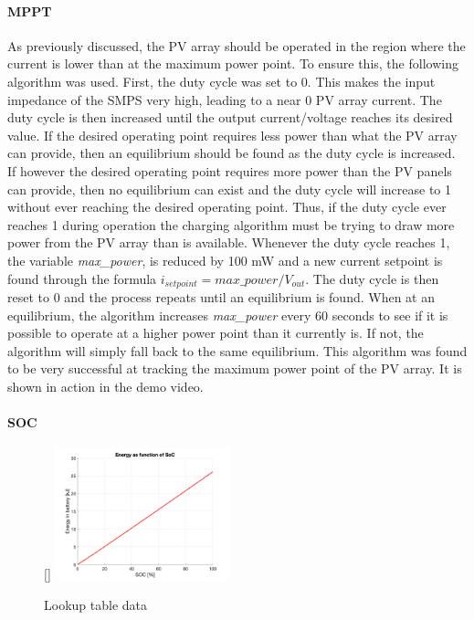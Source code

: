 \documentclass[a4paper]{article}
\begin{document}
\paragraph*{MPPT}
\vspace{-6pt}
As previously discussed, the PV array should be operated in the region 
where the current is lower than at the maximum power point. To ensure 
this, the following algorithm was used. First, the duty cycle was set 
to 0. This makes the input impedance of the SMPS very high, leading 
to a near 0 PV array current. The duty cycle is then increased until 
the output current/voltage reaches its desired value. If the desired 
operating point requires less power than what the PV array can provide, 
then an equilibrium should be found as the duty cycle is increased. 
If however the desired operating point requires more power than the 
PV panels can provide, then no equilibrium can exist and the duty 
cycle will increase to 1 without ever reaching the desired operating 
point. Thus, if the duty cycle ever reaches 1 during operation the 
charging algorithm must be trying to draw more power from the PV 
array than is available. Whenever the duty cycle reaches 1, the 
variable \emph{max\_power}, is reduced by 100 mW and a new current 
setpoint is found through the 
formula $i_{setpoint} = max\_power / V_{out}$. The duty cycle 
is then reset to 0 and the process repeats until an equilibrium 
is found. When at an equilibrium, the algorithm increases 
\emph{max\_power} every 60 seconds to see if it is possible to 
operate at a higher power point than it currently is. If not, 
the algorithm will simply fall back to the same equilibrium. This 
algorithm was found to be very successful at tracking the maximum 
power point of the PV array. It is shown in action in the demo video.

\paragraph*{SOC}
\begin{figure}
    \centering
    \raisebox{0pt}[\dimexpr{}\baselineskip\relax]{%
        \includegraphics[width=0.45\textwidth]{lookup.png}
    }%
    \vspace{-10pt}
    \caption{Lookup table data}
    \label{fig:lookup}
\end{figure}
\end{document}
